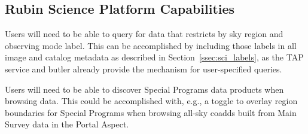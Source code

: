 \subsection{Rubin Science Platform Capabilities}\label{ssec:sci_rsp}

Users will need to be able to query for data that restricts by sky region and 
observing mode label. 
This can be accomplished by including those labels in all image and catalog 
metadata as described in Section~\ref{ssec:sci_labels}, as the TAP service 
and butler already provide the mechanism for user-specified queries.

Users will need to be able to discover Special Programs data products when 
browsing data.
This could be accomplished with, e.g., a toggle to overlay region boundaries
for Special Programs when browsing all-sky coadds built from Main Survey data
in the Portal Aspect.


